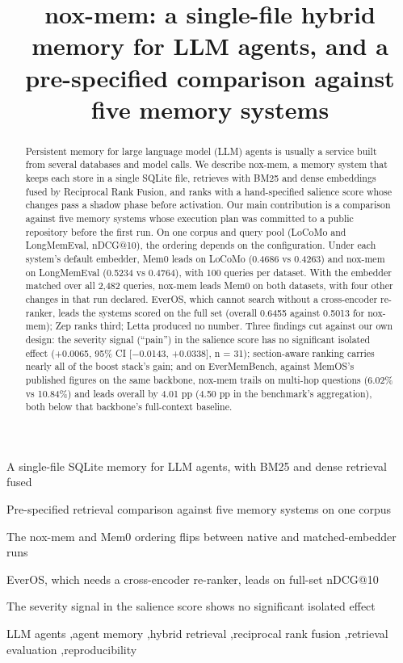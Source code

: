 \documentclass[a4paper,fleqn]{cas-sc}
\begin{document}
\let\WriteBookmarks\relax
\def\floatpagepagefraction{1}
\def\textpagefraction{.001}
\title[mode=title]{nox-mem: a single-file hybrid memory for LLM agents, and a pre-specified comparison against five memory systems}
\begin{abstract}
Persistent memory for large language model (LLM) agents is usually a service built from several databases and model calls. We describe nox-mem, a memory system that keeps each store in a single SQLite file, retrieves with BM25 and dense embeddings fused by Reciprocal Rank Fusion, and ranks with a hand-specified salience score whose changes pass a shadow phase before activation. Our main contribution is a comparison against five memory systems whose execution plan was committed to a public repository before the first run. On one corpus and query pool (LoCoMo and LongMemEval, nDCG@10), the ordering depends on the configuration. Under each system's default embedder, Mem0 leads on LoCoMo (0.4686 vs 0.4263) and nox-mem on LongMemEval (0.5234 vs 0.4764), with 100 queries per dataset. With the embedder matched over all 2,482 queries, nox-mem leads Mem0 on both datasets, with four other changes in that run declared. EverOS, which cannot search without a cross-encoder re-ranker, leads the systems scored on the full set (overall 0.6455 against 0.5013 for nox-mem); Zep ranks third; Letta produced no number. Three findings cut against our own design: the severity signal (``pain'') in the salience score has no significant isolated effect (+0.0065, 95\% CI {[}−0.0143, +0.0338{]}, n = 31); section-aware ranking carries nearly all of the boost stack's gain; and on EverMemBench, against MemOS's published figures on the same backbone, nox-mem trails on multi-hop questions (6.02\% vs 10.84\%) and leads overall by 4.01 pp (4.50 pp in the benchmark's aggregation), both below that backbone's full-context baseline.
\end{abstract}
\begin{highlights}
\item A single-file SQLite memory for LLM agents, with BM25 and dense retrieval fused
\item Pre-specified retrieval comparison against five memory systems on one corpus
\item The nox-mem and Mem0 ordering flips between native and matched-embedder runs
\item EverOS, which needs a cross-encoder re-ranker, leads on full-set nDCG@10
\item The severity signal in the salience score shows no significant isolated effect
\end{highlights}
\begin{keywords}
LLM agents \sep agent memory \sep hybrid retrieval \sep reciprocal rank fusion \sep retrieval evaluation \sep reproducibility
\end{keywords}
\maketitle
\end{document}
